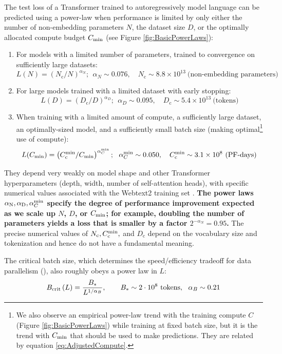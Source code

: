 \documentclass[english]{article}
\newcommand{\be}{\begin{equation}}
\newcommand{\ee}{\end{equation}}
\begin{document}
The test loss of a Transformer trained to autoregressively model language can be predicted using a power-law  when performance is limited by only either the number of non-embedding parameters $N$, the dataset size $D$, or the optimally allocated compute budget $C_{\rm min}$ (see Figure \ref{fig:BasicPowerLaws}):
\begin{enumerate}
\setlength\itemsep{0.5em}
\item For models with a limited number of parameters, trained to convergence on sufficiently large datasets:
\be L(N) = \left(N_{\mathrm{c}}/N\right)^{\alpha_N};~~ \alpha_N \sim 0.076, \quad N_{\mathrm{c}} \sim 8.8 \times 10^{13}~\text{(non-embedding parameters)} \label{eq:crit_n} \ee
\item For large models trained with a limited dataset with early stopping:
\be L(D) = \left(D_{\mathrm{c}}/D\right)^{\alpha_D};~~ \alpha_D \sim 0.095, \quad D_{\mathrm{c}} \sim 5.4 \times 10^{13}~\text{(tokens)} \label{eq:crit_d} \ee
\item When training with a limited amount of compute, a sufficiently large dataset, an optimally-sized model, and a sufficiently small batch size (making optimal\footnote{We also observe an empirical power-law trend with the training compute $C$ (Figure \ref{fig:BasicPowerLaws}) while training at fixed batch size, but it is the trend with $C_{\rm min}$ that should be used to make predictions.  They are related by equation \eqref{eq:AdjustedCompute}. } use of compute):
\be L(C_{\rm min}) = \left(C_{\mathrm{c}}^{\rm min} / C_{\rm min}\right)^{\alpha_C^{\rm min}};~~ \alpha_C^{\rm min} \sim 0.050, \quad C_{\mathrm{c}}^{\rm min} \sim 3.1 \times 10^{8}~\text{(PF-days)} \label{eq:crit_c} \ee
\end{enumerate}

They depend very weakly on model shape and other Transformer hyperparameters (depth, width, number of self-attention heads), with specific numerical values associated with the Webtext2 training set \cite{radford2019language}.
\textbf{The power laws $\alpha_{\rm N}, \alpha_{\rm D}, \alpha_{C}^{\rm min}$ specify the degree of performance improvement expected as we scale up $N$, $D$, or $C_{\rm min}$; for example, doubling the number of parameters yields a loss that is smaller by a factor $2^{-\alpha_N}=0.95$.}
The precise numerical values of $N_{\mathrm{c}}, C_{\rm c}^{\rm min},$ and $D_{\mathrm{c}}$ depend on the vocabulary size and tokenization and hence do not have a fundamental meaning.  


The critical batch size, which determines the speed/efficiency tradeoff for data parallelism (\cite{1812.06162}), also roughly obeys a power law in $L$:
\begin{equation}
B_{\rm crit}\left(L\right)=\frac{B_{\ast}}{L^{1/\alpha_{B}}},\qquad B_{\ast} \sim 2\cdot 10^8 \text{ tokens},\ \ \alpha_{B} \sim 0.21
\label{eq:critical-batch-size}
\end{equation}
\end{document}
